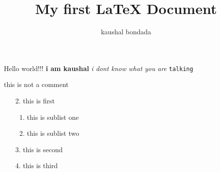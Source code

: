 \documentclass{article}
\begin{document}
    \title{My first \LaTeX{} Document}
    \author{kaushal bondada}
    \maketitle

    \noindent Hello world!!! \textbf{i am kaushal} \textit{i dont
    know what you are} \texttt{talking}

    \noindent this is not a comment

    \begin{enumerate}
        \item[2.]  this is first
            \begin{enumerate}
                \item this is sublist one
                \item this is sublist two
            \end{enumerate}
        \item[3.] this is second
        \item[4.] this is third
    \end{enumerate}
\end{document}

